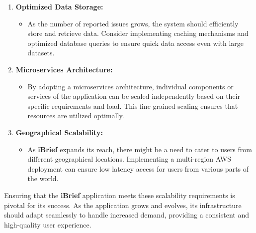 \begin{enumerate}
    \item \textbf{Optimized Data Storage:}
    \begin{itemize}
        \item As the number of reported issues grows, the system should efficiently store and retrieve data. Consider implementing caching mechanisms and optimized database queries to ensure quick data access even with large datasets.
    \end{itemize}
    
    \item \textbf{Microservices Architecture:}
    \begin{itemize}
        \item By adopting a microservices architecture, individual components or services of the application can be scaled independently based on their specific requirements and load. This fine-grained scaling ensures that resources are utilized optimally.
    \end{itemize}
    
    \item \textbf{Geographical Scalability:}
    \begin{itemize}
        \item As \textbf{iBrief} expands its reach, there might be a need to cater to users from different geographical locations. Implementing a multi-region AWS deployment can ensure low latency access for users from various parts of the world.
    \end{itemize}
\end{enumerate}

Ensuring that the \textbf{iBrief} application meets these scalability requirements is pivotal for its success. As the application grows and evolves, its infrastructure should adapt seamlessly to handle increased demand, providing a consistent and high-quality user experience.
